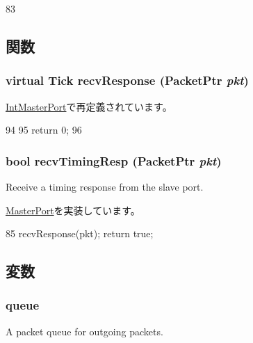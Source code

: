 \begin{DoxyCode}
83     {}
\end{DoxyCode}


\subsection{関数}
\hypertarget{classMessageMasterPort_ae473b2a0c55e73359b9643810869ca81}{
\subsubsection[{recvResponse}]{\setlength{\rightskip}{0pt plus 5cm}virtual {\bf Tick} recvResponse ({\bf PacketPtr} {\em pkt})}}
\label{classMessageMasterPort_ae473b2a0c55e73359b9643810869ca81}


\hyperlink{classX86ISA_1_1IntDevice_1_1IntMasterPort_a96d1a00beed669f9145d55bc3675d99c}{IntMasterPort}で再定義されています。


\begin{DoxyCode}
94     {
95         return 0;
96     }
\end{DoxyCode}
\hypertarget{classMessageMasterPort_a482dba5588f4bee43e498875a61e5e0b}{
\subsubsection[{recvTimingResp}]{\setlength{\rightskip}{0pt plus 5cm}bool recvTimingResp ({\bf PacketPtr} {\em pkt})}}
\label{classMessageMasterPort_a482dba5588f4bee43e498875a61e5e0b}
Receive a timing response from the slave port. 

\hyperlink{classMasterPort_abd323548d6c93f8b0543f1fe3a86ca35}{MasterPort}を実装しています。


\begin{DoxyCode}
85 { recvResponse(pkt); return true; }
\end{DoxyCode}


\subsection{変数}
\hypertarget{classMessageMasterPort_aae3ed0c3ef8ff189915e74fe401279b5}{
\subsubsection[{queue}]{ {\bf queue}}}
\label{classMessageMasterPort_aae3ed0c3ef8ff189915e74fe401279b5}
A packet queue for outgoing packets. 

